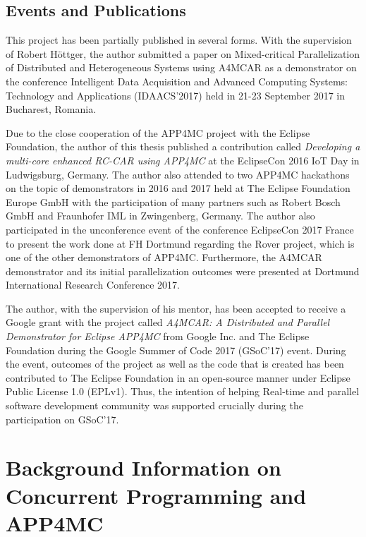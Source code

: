 \section{Events and Publications}

This project has been partially published in several forms. With the supervision of Robert H{\"o}ttger, the author submitted a paper on Mixed-critical Parallelization of Distributed and Heterogeneous Systems \cite{constrainedpaper} using A4MCAR as a demonstrator on the conference Intelligent Data Acquisition and Advanced Computing Systems: Technology and Applications (IDAACS'2017) held in 21-23 September 2017 in Bucharest, Romania.

Due to the close cooperation of the APP4MC project with the Eclipse Foundation, the author of this thesis published a contribution called \textit{Developing a multi-core enhanced RC-CAR using APP4MC} at the EclipseCon 2016 IoT Day in Ludwigsburg, Germany. The author also attended to two APP4MC hackathons on the topic of demonstrators in 2016 and 2017 held at The Eclipse Foundation Europe GmbH with the participation of many partners such as Robert Bosch GmbH and Fraunhofer IML in Zwingenberg, Germany. The author also participated in the unconference event of the conference EclipseCon 2017 France to present the work done at FH Dortmund regarding the Rover project, which is one of the other demonstrators of APP4MC. Furthermore, the A4MCAR demonstrator and its initial parallelization outcomes were presented at Dortmund International Research Conference 2017.

The author, with the supervision of his mentor, has been accepted to receive a Google grant with the project called \textit{A4MCAR: A Distributed and Parallel Demonstrator for Eclipse APP4MC} \cite{gsoc} from Google Inc. and The Eclipse Foundation during the Google Summer of Code 2017 (GSoC'17) event. During the event, outcomes of the project as well as the code that is created has been contributed to The Eclipse Foundation in an open-source manner under Eclipse Public License 1.0 (EPLv1). Thus, the intention of helping Real-time and parallel software development community was supported crucially during the participation on GSoC'17.

\chapter{Background Information on Concurrent Programming and APP4MC} \label{multicorechapter} 

